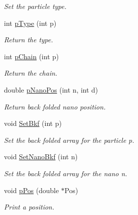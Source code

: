 \begin{DoxyCompactItemize}
\begin{DoxyCompactList}\small\item\em Set the particle type. \end{DoxyCompactList}\item 
int \hyperlink{classVarData_a75896c37dd78ba0d2da013ad4cf0e87c}{p\+Type} (int p)\hypertarget{classVarData_a75896c37dd78ba0d2da013ad4cf0e87c}{}\label{classVarData_a75896c37dd78ba0d2da013ad4cf0e87c}

\begin{DoxyCompactList}\small\item\em Return the type. \end{DoxyCompactList}\item 
int \hyperlink{classVarData_ab7c7c0a0081da25f3d4624ae61dc9d68}{p\+Chain} (int p)\hypertarget{classVarData_ab7c7c0a0081da25f3d4624ae61dc9d68}{}\label{classVarData_ab7c7c0a0081da25f3d4624ae61dc9d68}

\begin{DoxyCompactList}\small\item\em Return the chain. \end{DoxyCompactList}\item 
double \hyperlink{classVarData_a0f556f4717568ddf4b1a4b2111b8d8f3}{p\+Nano\+Pos} (int n, int d)\hypertarget{classVarData_a0f556f4717568ddf4b1a4b2111b8d8f3}{}\label{classVarData_a0f556f4717568ddf4b1a4b2111b8d8f3}

\begin{DoxyCompactList}\small\item\em Return back folded nano position. \end{DoxyCompactList}\item 
void \hyperlink{classVarData_a7994a751e400e4df33a6a6fb8a8ba025}{Set\+Bkf} (int p)\hypertarget{classVarData_a7994a751e400e4df33a6a6fb8a8ba025}{}\label{classVarData_a7994a751e400e4df33a6a6fb8a8ba025}

\begin{DoxyCompactList}\small\item\em Set the back folded array for the particle p. \end{DoxyCompactList}\item 
void \hyperlink{classVarData_ae93d1705bac1b8fafb6feab474ac8f46}{Set\+Nano\+Bkf} (int n)\hypertarget{classVarData_ae93d1705bac1b8fafb6feab474ac8f46}{}\label{classVarData_ae93d1705bac1b8fafb6feab474ac8f46}

\begin{DoxyCompactList}\small\item\em Set the back folded array for the nano n. \end{DoxyCompactList}\item 
void \hyperlink{classVarData_a08e1dc218828fb8e3b3c9c02fccd6950}{p\+Pos} (double $\ast$Pos)\hypertarget{classVarData_a08e1dc218828fb8e3b3c9c02fccd6950}{}\label{classVarData_a08e1dc218828fb8e3b3c9c02fccd6950}

\begin{DoxyCompactList}\small\item\em Print a position. \end{DoxyCompactList}\end{DoxyCompactItemize}
